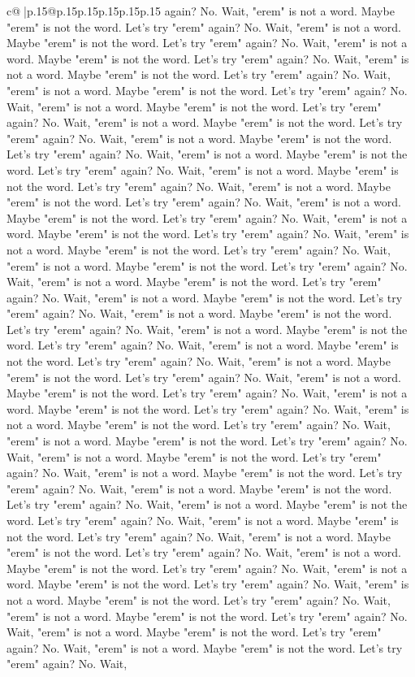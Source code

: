 \documentclass{article}
\begin{document}
{\begin{supertabular}{c@{$\;$}|p{.15\linewidth}@{}p{.15\linewidth}p{.15\linewidth}p{.15\linewidth}p{.15\linewidth}p{.15\linewidth}}
{{{again? No. Wait, "erem" is not a word. Maybe "erem" is not the word. Let's try "erem" again? No. Wait, "erem" is not a word. Maybe "erem" is not the word. Let's try "erem" again? No. Wait, "erem" is not a word. Maybe "erem" is not the word. Let's try "erem" again? No. Wait, "erem" is not a word. Maybe "erem" is not the word. Let's try "erem" again? No. Wait, "erem" is not a word. Maybe "erem" is not the word. Let's try "erem" again? No. Wait, "erem" is not a word. Maybe "erem" is not the word. Let's try "erem" again? No. Wait, "erem" is not a word. Maybe "erem" is not the word. Let's try "erem" again? No. Wait, "erem" is not a word. Maybe "erem" is not the word. Let's try "erem" again? No. Wait, "erem" is not a word. Maybe "erem" is not the word. Let's try "erem" again? No. Wait, "erem" is not a word. Maybe "erem" is not the word. Let's try "erem" again? No. Wait, "erem" is not a word. Maybe "erem" is not the word. Let's try "erem" again? No. Wait, "erem" is not a word. Maybe "erem" is not the word. Let's try "erem" again? No. Wait, "erem" is not a word. Maybe "erem" is not the word. Let's try "erem" again? No. Wait, "erem" is not a word. Maybe "erem" is not the word. Let's try "erem" again? No. Wait, "erem" is not a word. Maybe "erem" is not the word. Let's try "erem" again? No. Wait, "erem" is not a word. Maybe "erem" is not the word. Let's try "erem" again? No. Wait, "erem" is not a word. Maybe "erem" is not the word. Let's try "erem" again? No. Wait, "erem" is not a word. Maybe "erem" is not the word. Let's try "erem" again? No. Wait, "erem" is not a word. Maybe "erem" is not the word. Let's try "erem" again? No. Wait, "erem" is not a word. Maybe "erem" is not the word. Let's try "erem" again? No. Wait, "erem" is not a word. Maybe "erem" is not the word. Let's try "erem" again? No. Wait, "erem" is not a word. Maybe "erem" is not the word. Let's try "erem" again? No. Wait, "erem" is not a word. Maybe "erem" is not the word. Let's try "erem" again? No. Wait, "erem" is not a word. Maybe "erem" is not the word. Let's try "erem" again? No. Wait, "erem" is not a word. Maybe "erem" is not the word. Let's try "erem" again? No. Wait, "erem" is not a word. Maybe "erem" is not the word. Let's try "erem" again? No. Wait, "erem" is not a word. Maybe "erem" is not the word. Let's try "erem" again? No. Wait, "erem" is not a word. Maybe "erem" is not the word. Let's try "erem" again? No. Wait, "erem" is not a word. Maybe "erem" is not the word. Let's try "erem" again? No. Wait, "erem" is not a word. Maybe "erem" is not the word. Let's try "erem" again? No. Wait, "erem" is not a word. Maybe "erem" is not the word. Let's try "erem" again? No. Wait, "erem" is not a word. Maybe "erem" is not the word. Let's try "erem" again? No. Wait, "erem" is not a word. Maybe "erem" is not the word. Let's try "erem" again? No. Wait, "erem" is not a word. Maybe "erem" is not the word. Let's try "erem" again? No. Wait, "erem" is not a word. Maybe "erem" is not the word. Let's try "erem" again? No. Wait, "erem" is not a word. Maybe "erem" is not the word. Let's try "erem" again? No. Wait, "erem" is not a word. Maybe "erem" is not the word. Let's try "erem" again? No. Wait, }}}
\end{supertabular}}
\end{document}
